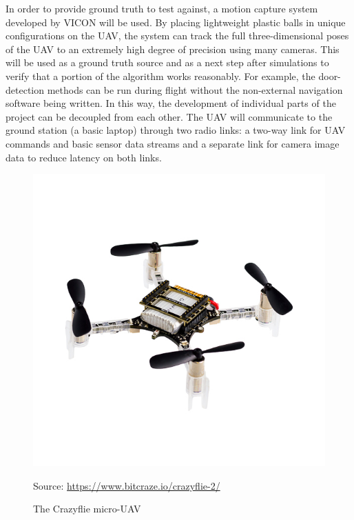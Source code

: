 \documentclass[12pt]{article}
\begin{document}
In order to provide ground truth to test against, a motion capture system developed by VICON will be used. By placing lightweight plastic balls in unique configurations on the UAV, the system can track the full three-dimensional poses of the UAV to an extremely high degree of precision using many cameras. This will be used as a ground truth source and as a next step after simulations to verify that a portion of the algorithm works reasonably. For example, the door-detection methods can be run during flight without the non-external navigation software being written. In this way, the development of individual parts of the project can be decoupled from each other. The UAV will communicate to the ground station (a basic laptop) through two radio links: a two-way link for UAV commands and basic sensor data streams and a separate link for camera image data to reduce latency on both links.

\begin{figure}
	\centering
	\includegraphics[scale=1.7]{crazyflie_new}
	\caption[The Crazyflie micro-UAV]{The Crazyflie micro-UAV}
	\vspace{8pt}
	\small Source: \url{https://www.bitcraze.io/crazyflie-2/}
	\label{crazyflie_image}
\end{figure}
\end{document}
